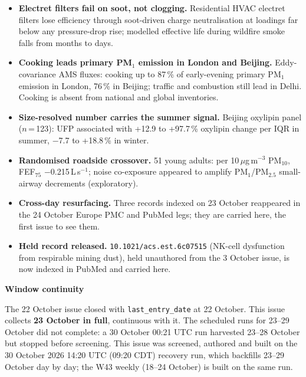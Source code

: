 \documentclass[10pt]{article}
\begin{document}
\footnotesize
\begin{itemize}

\item \textbf{Electret filters fail on soot, not clogging.} Residential HVAC electret filters lose efficiency through
soot-driven charge neutralisation at loadings far below any pressure-drop rise; modelled effective life during
wildfire smoke falls from months to days.

\item \textbf{Cooking leads primary PM$_1$ emission in London and Beijing.} Eddy-covariance AMS fluxes: cooking up to 87\,\%
of early-evening primary PM$_1$ emission in London, 76\,\% in Beijing; traffic and combustion still lead in Delhi.
Cooking is absent from national and global inventories.

\item \textbf{Size-resolved number carries the summer signal.} Beijing oxylipin panel ($n$\,=\,123): UFP associated with
+12.9 to +97.7\,\% oxylipin change per IQR in summer, $-$7.7 to +18.8\,\% in winter.

\item \textbf{Randomised roadside crossover.} 51 young adults: per 10\,$\mu$g\,m$^{-3}$ PM$_{10}$, FEF$_{75}$
$-$0.215\,L\,s$^{-1}$; noise co-exposure appeared to amplify PM$_1$/PM$_{2.5}$ small-airway decrements (exploratory).

\item \textbf{Cross-day resurfacing.} Three records indexed on 23 October reappeared in the 24 October Europe PMC and PubMed
legs; they are carried here, the first issue to see them.

\item \textbf{Held record released.} \texttt{10.1021/acs.est.6c07515} (NK-cell dysfunction from respirable mining dust),
held unauthored from the 3 October issue, is now indexed in PubMed and carried here.

\end{itemize}

\vspace{2mm}

\begin{keybox}
{\sffamily\bfseries\footnotesize\color{Deep}Window continuity}\\[1.2mm]
{\fontsize{7.2}{8.8}\selectfont
The 22 October issue closed with \texttt{last\_entry\_date} at 22 October. This issue collects
\textbf{23 October in full}, continuous with it. The scheduled runs for 23--29 October did not complete: a 30 October
00:21 UTC run harvested 23--28 October but stopped before screening. This issue was screened, authored and built on
the 30 October 2026 14:20 UTC (09:20 CDT) recovery run, which backfills 23--29 October day by day; the W43 weekly (18--24 October)
is built on the same run.\par}
\end{keybox}
\end{document}
